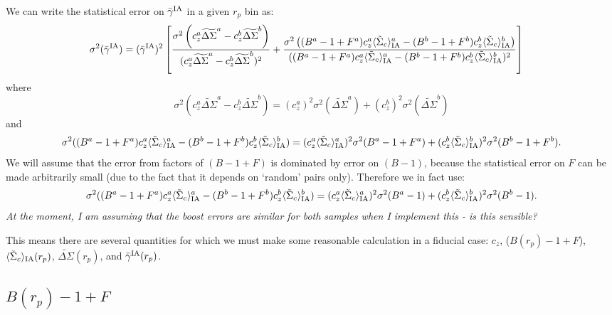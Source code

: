 \documentclass[onecolumn,amsmath,aps,fleqn, superscriptaddress]{revtex4}
\begin{document}
We can write the statistical error on $\bar{\gamma}^{\rm IA}$ in a given $r_p$ bin as:
\begin{align}
\sigma^2(\bar{\gamma}^{\rm IA}) &= (\bar{\gamma}^{\rm IA})^2 \left[\frac{\sigma^2\left(c_z^a \widetilde{\Delta\Sigma}^a - c_z^b \widetilde{\Delta\Sigma}^b\right)}{(c_z^a \widetilde{\Delta\Sigma}^a - c_z^b \widetilde{\Delta\Sigma}^b)^2} + \frac{\sigma^2\left((B^a-1+F^a)c_z^a \langle \tilde{\Sigma}_c\rangle_{\rm IA}^a - (B^b-1+F^b)c_z^b \langle \tilde{\Sigma}_c\rangle_{\rm IA}^b\right)}{((B^a-1+F^a)c_z^a \langle \tilde{\Sigma}_c\rangle_{\rm IA}^a - (B^b-1+F^b)c_z^b \langle \tilde{\Sigma}_c\rangle_{\rm IA}^b)^2} \right] 
\label{siggam}
\end{align}
where
\begin{equation}
\sigma^2(c_z^a \widetilde{\Delta\Sigma}^a  - c_z^b \widetilde{\Delta\Sigma}^b) = (c_z^a)^2  \sigma^2 (\widetilde{\Delta\Sigma}^a) + (c_z^b)^2\sigma^2(\widetilde{\Delta\Sigma}^b)
\label{sigtop}
\end{equation}
and 
\begin{equation}
\sigma^2((B^a-1+F^a)c_z^a \langle \tilde{\Sigma}_c\rangle_{\rm IA}^a - (B^b-1+F^b)c_z^b \langle \tilde{\Sigma}_c\rangle_{\rm IA}^b) = (c_z^a \langle \tilde{\Sigma}_c\rangle_{\rm IA}^a)^2 \sigma^2(B^a-1+F^a) + (c_z^b \langle \tilde{\Sigma}_c\rangle_{\rm IA}^b)^2 \sigma^2(B^b-1+F^b).
\label{sigbottom}
\end{equation}
We will assume that the error from factors of $(B-1+F)$ is dominated by error on $(B-1)$, because the statistical error on $F$ can be made arbitrarily small (due to the fact that it depends on `random' pairs only). Therefore we in fact use:
\begin{equation}
\sigma^2((B^a-1+F^a)c_z^a \langle \tilde{\Sigma}_c\rangle_{\rm IA}^a - (B^b-1+F^b)c_z^b \langle \tilde{\Sigma}_c\rangle_{\rm IA}^b) = (c_z^a \langle \tilde{\Sigma}_c\rangle_{\rm IA}^a)^2 \sigma^2(B^a-1) + (c_z^b \langle \tilde{\Sigma}_c\rangle_{\rm IA}^b)^2 \sigma^2(B^b-1).
\label{sigbottom}
\end{equation}
{\it At the moment, I am assuming that the boost errors are similar for both samples when I implement this - is this sensible?}

This means there are several quantities for which we must make some reasonable calculation in a fiducial case: $c_z$, ($B(r_p)-1+F$), $\langle \tilde{\Sigma}_c\rangle_{\rm IA}(r_p)$, $\widetilde{\Delta\Sigma}(r_p)$, and $\bar{\gamma}^{\rm IA}(r_p)$.

\subsection{$B(r_p)-1+F$}
\end{document}
